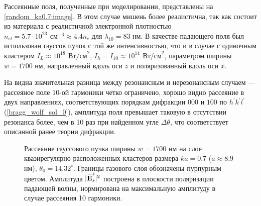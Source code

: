 
Рассеянные поля, полученные при моделировании, представлены на \autoref{random_ka0.7:image}. В этом случае мишень более реалистична, так как состоит из материала с реалистичной электронной плотностью $n_{el} = 5.7 \cdot 10^{23}\:\,\textrm{см}^{-3} \approx 4.4 n_{c}$ для $\lambda_{10} = 83$ нм. В качестве падающего поля был использован гауссов пучок с той же интенсивностью, что и в случае с одиночным кластером $I_{L} \approx 10^{18}\:\,\textrm{Вт/см}^2$, $I_h = I_{10} \approx 10^{14}\:\,\textrm{Вт/см}^2$, параметром ширины $w = 1700$ нм, направленный вдоль оси $z$ и поляризованный вдоль оси $x$.

На  видна значительная разница между резонансным и нерезонансным случаем --- рассеяное поле $10$-ой гармоники четко ограничено, хорошо видно рассеяние в двух направлениях, соответствующих порядкам дифракции $000$ и $100$ по $h^\prime k^\prime l^\prime$ (\autoref{bragg_wolf_sol_0}), амплитуда поля превышает таковую в отсутствии резонанса более, чем в 10 раз при найденном угле $\Delta\theta$, что соответствует описанной ранее теории дифракции.

    \begin{figure}[ht]
        \hfil
        \caption{Рассеяние гауссового пучка ширины $w = 1700$ нм на слое квазирегулярно расположенных кластеров размера $ka = 0.7$ ($a \approx 8.9$ нм), $\theta_0 = 14.32^{\circ}$. Границы газового слоя обозначены пурпурным цветом. Амплитуда $|\overrightarrow{\textbf{E}_{s}}|^2$ построена в плоскости поляризации падающей волны, нормирована на максимальную амплитуду в случае рассеяния 10 гармоники.}\label{random_ka0.7:image}
    \end{figure}

